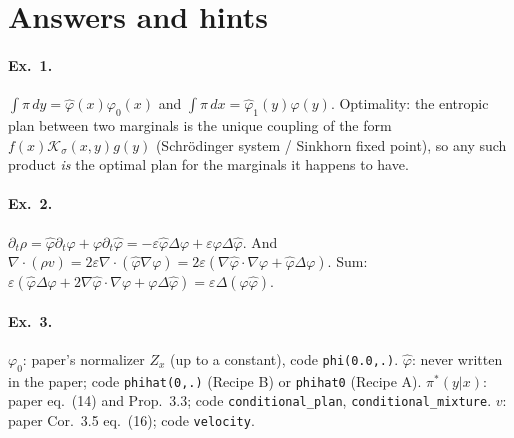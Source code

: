 \documentclass[11pt]{article}
\newcommand{\eps}{\varepsilon}
\newcommand{\code}[1]{\texttt{#1}}
\newcommand{\dv}{\nabla\cdot}
\newcommand{\Kc}{\mathcal{K}}
\newcommand{\hphi}{\hat\varphi}
\newcounter{ex}
\begin{document}
\appendix
\section{Answers and hints}
\label{sec:answers}

\paragraph{Ex.\ 1.} $\int\pi\,dy=\hphi(x)\varphi_0(x)$ and $\int\pi\,dx=\hphi_1(y)\varphi(y)$.
Optimality: the entropic plan between two marginals is the unique coupling of the form
$f(x)\Kc_\sigma(x,y)g(y)$ (Schr\"odinger system / Sinkhorn fixed point), so any such
product \emph{is} the optimal plan for the marginals it happens to have.

\paragraph{Ex.\ 2.} $\partial_t\rho=\hphi\partial_t\varphi+\varphi\partial_t\hphi
=-\eps\hphi\Delta\varphi+\eps\varphi\Delta\hphi$. And
$\dv(\rho v)=2\eps\dv(\hphi\nabla\varphi)=2\eps(\nabla\hphi\cdot\nabla\varphi+\hphi\Delta\varphi)$.
Sum: $\eps(\hphi\Delta\varphi+2\nabla\hphi\cdot\nabla\varphi+\varphi\Delta\hphi)=\eps\Delta(\varphi\hphi)$.

\paragraph{Ex.\ 3.} $\varphi_0$: paper's normalizer $Z_x$ (up to a constant), code
\code{phi(0.0,.)}. $\hphi$: never written in the paper; code \code{phihat(0,.)} (Recipe B) or
\code{phihat0} (Recipe A). $\pi^*(y|x)$: paper eq.\ (14) and Prop.\ 3.3; code
\code{conditional\_plan}, \code{conditional\_mixture}. $v$: paper Cor.\ 3.5 eq.\ (16); code
\code{velocity}.
\end{document}
